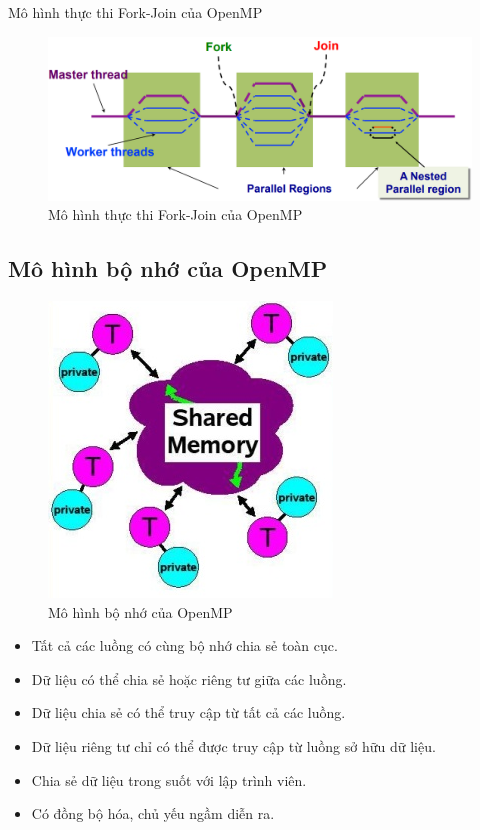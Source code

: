 \documentclass[14pt, a4paper]{article}
\numberwithin{equation}{section}
\numberwithin{figure}{section}
\numberwithin{dl}{section}
\numberwithin{md}{section}
\numberwithin{bd}{section}
\numberwithin{dn}{section}
\numberwithin{hq}{section}
\begin{document}
Mô hình thực thi Fork-Join của OpenMP

\begin{figure}[H]
    \centering
    \includegraphics[width=\linewidth]{figures/OpenMP/Fork_Join_Execution_Model.png}
    \caption{Mô hình thực thi Fork-Join của OpenMP}
\end{figure}

\subsection{Mô hình bộ nhớ của OpenMP}


\begin{figure}[H]
    \centering
    \includegraphics[width=0.7\linewidth]{figures/OpenMP/OpenMP_Shared_Memory_Model.png}
    \caption{Mô hình bộ nhớ của OpenMP}
\end{figure}

\begin{itemize}
    \item Tất cả các luồng có cùng bộ nhớ chia sẻ toàn cục.
    \item Dữ liệu có thể chia sẻ hoặc riêng tư giữa các luồng.
    \item Dữ liệu chia sẻ có thể truy cập từ tất cả các luồng.
    \item Dữ liệu riêng tư chỉ có thể được truy cập từ luồng sở hữu dữ liệu.
    \item Chia sẻ dữ liệu trong suốt với lập trình viên.
    \item Có đồng bộ hóa, chủ yếu ngầm diễn ra.
\end{itemize}
\end{document}
